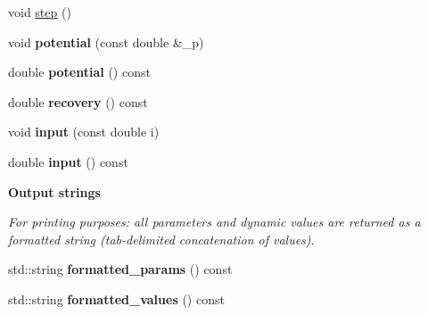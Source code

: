 \begin{DoxyCompactItemize}
\item 
void \hyperlink{classNeuron_a224d5cead5f94bbe15ae49774db3e174}{step} ()
\item 
\mbox{\label{classNeuron_a47ea1a8f25dd62a34c9e0bdc0b7ae7fb}} 
void {\bfseries potential} (const double \&\+\_\+p)
\item 
\mbox{\label{classNeuron_aab6607e17778ff1b4c05610c935b3156}} 
double {\bfseries potential} () const
\item 
\mbox{\label{classNeuron_a2e84bc427827092295070dec404886f4}} 
double {\bfseries recovery} () const
\item 
\mbox{\label{classNeuron_ab6b4f1a9633eaae9967cc6b226eed5fa}} 
void {\bfseries input} (const double i)
\item 
\mbox{\label{classNeuron_ac00c31820b58e9c6f909db6a12e58b34}} 
double {\bfseries input} () const
\end{DoxyCompactItemize}
\begin{Indent}\textbf{ Output strings}\par
{\em For printing purposes\+: all parameters and dynamic values are returned as a formatted string (tab-\/delimited concatenation of values). }\begin{DoxyCompactItemize}
\item 
\mbox{\label{classNeuron_a24dc0979745c7e25cfa997d88d973896}} 
std\+::string {\bfseries formatted\+\_\+params} () const
\item 
\mbox{\label{classNeuron_aa1c46c99ed3e1a349b5e0ee82aec3026}} 
std\+::string {\bfseries formatted\+\_\+values} () const
\end{DoxyCompactItemize}
\end{Indent}
